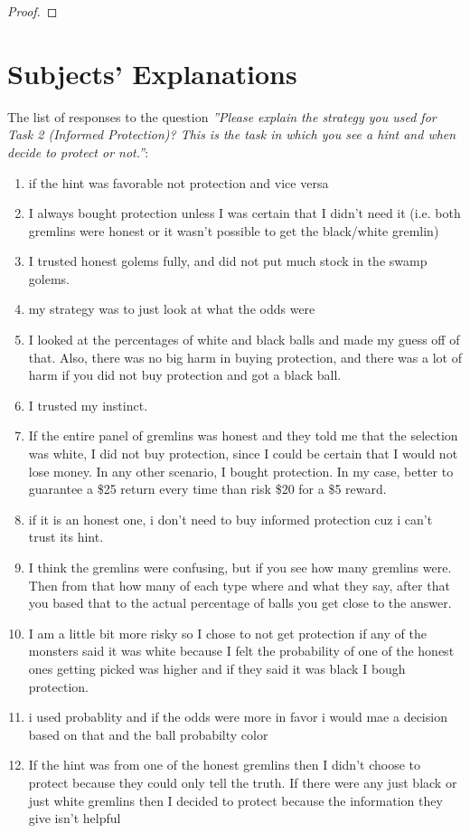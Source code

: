 \documentclass[12pt,a4paper]{article}
\begin{document}
\begin{appendices}
\begin{proof}
\end{proof}




\newpage
\section{Subjects' Explanations}
\footnotesize
The list of responses to the question \textit{''Please explain the strategy you used for Task 2 (Informed Protection)? This is the task in which you see a hint and when decide to protect or not.''}:
\begin{enumerate}
\itemsep0em 
\item if the hint was favorable not protection and vice versa
\item I always bought protection unless I was certain that I didn't need it (i.e. both gremlins were honest or it wasn't possible to get the black/white gremlin)
\item I trusted honest golems fully, and did not put much stock in the swamp golems.
\item my strategy was to just look at what the odds were
\item I looked at the percentages of white and black balls and made my guess off of that. Also, there was no big harm in buying protection, and there was a lot of harm if you did not buy protection and got a black ball.
\item I trusted my instinct.
\item If the entire panel of gremlins was honest and they told me that the selection was white, I did not buy protection, since I could be certain that I would not lose money. In any other scenario, I bought protection. In my case, better to guarantee a \$25 return every time than risk \$20 for a \$5 reward.
\item if it is an honest one, i don't need to buy informed protection cuz i can't trust its hint.
\item I think the gremlins were confusing, but if you see how many gremlins were. Then from that how many of each type where and what they say, after that you based that to the actual percentage of balls you get close to the answer.
\item I am a little bit more risky so I chose to not get protection if any of the monsters said it was white because I felt the probability of one of the honest ones getting picked was higher and if they said it was black I bough protection.
\item i used probablity and if the odds were more in favor i would mae a decision based on that and the ball probabilty color
\item If the hint was from one of the honest gremlins then I didn't choose to protect because they could only tell the truth. If there were any just black or just white gremlins then I decided to protect because the information they give isn't helpful


\end{enumerate}
\end{appendices}
\end{document}
